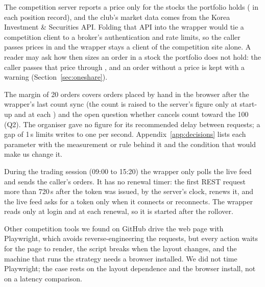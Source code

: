 \seclabel
{}

 The competition server reports a price only for the stocks the portfolio holds ( in each position record), and the club's market data comes from the Korea Investment \& Securities API. Folding that API into the wrapper would tie a competition client to a broker's authentication and rate limits, so the caller passes prices in and the wrapper stays a client of the competition site alone. A reader may ask how  then sizes an order in a stock the portfolio does not hold: the caller passes that price through , and an order without a price is kept with a warning (Section~\ref{sec:oneshare}).



 The margin of 20 orders covers orders placed by hand in the browser after the wrapper's last count sync (the count is raised to the server's figure only at start-up and at each ) and the open question whether cancels count toward the 100 (Q2). The organiser gave no figure for its recommended delay between requests; a gap of 1\,s limits writes to one per second. Appendix~\ref{app:decisions} lists each parameter with the measurement or rule behind it and the condition that would make us change it.

 During the trading session (09:00 to 15:20) the wrapper only polls the live feed and sends the caller's orders. It has no renewal timer: the first REST request more than 720\,s after the token was issued, by the server's clock, renews it, and the live feed asks for a token only when it connects or reconnects. The wrapper reads  only at login and at each renewal, so it is started after the rollover.



 Other competition tools we found on GitHub drive the web page with Playwright, which avoids reverse-engineering the requests, but every action waits for the page to render, the script breaks when the layout changes, and the machine that runs the strategy needs a browser installed. We did not time Playwright; the case rests on the layout dependence and the browser install, not on a latency comparison.

